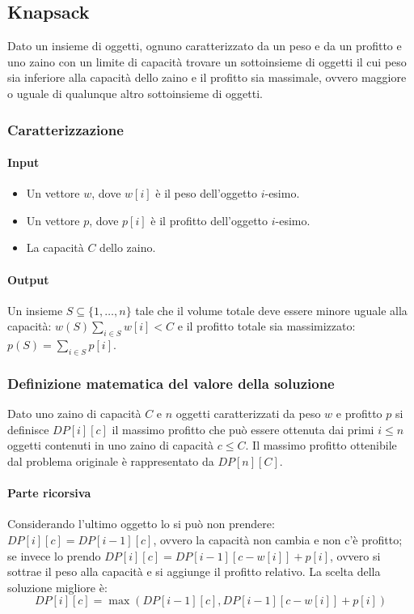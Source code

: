 \subsection{Knapsack}
Dato un insieme di oggetti, ognuno caratterizzato da un peso e da un profitto e uno zaino con un limite di capacit\`a trovare un sottoinsieme di oggetti il 
cui peso sia inferiore alla capacit\`a dello zaino e il profitto sia massimale, ovvero maggiore o uguale di qualunque altro sottoinsieme di oggetti. 
\subsubsection{Caratterizzazione}
\paragraph{Input}
\begin{itemize}
\item Un vettore $w$, dove $w[i]$ \`e il peso dell'oggetto $i$-esimo.
\item Un vettore $p$, dove $p[i]$ \`e il profitto dell'oggetto $i$-esimo.
\item La capacit\`a $C$ dello zaino.
\end{itemize}
\paragraph{Output}
Un insieme $S\subseteq\{1,\dots, n\}$ tale che il volume totale deve essere minore uguale alla capacit\`a: $w(S)\sum\limits_{i\in S}w[i]<C$ e il profitto
totale sia massimizzato: $p(S)=\sum\limits_{i\in S}p[i]$.
\subsubsection{Definizione matematica del valore della soluzione}
Dato uno zaino di capacit\`a $C$ e $n$ oggetti caratterizzati da peso $w$ e profitto $p$ si definisce $DP[i][c]$ il massimo profitto che pu\`o essere 
ottenuta dai primi $i\le n$ oggetti contenuti in uno zaino di capacit\`a $c\le C$. Il massimo profitto ottenibile dal problema originale \`e rappresentato
da $DP[n][C]$.
\paragraph{Parte ricorsiva}
Considerando l'ultimo oggetto lo si pu\`o non prendere: $DP[i][c]=DP[i-1][c]$, ovvero la capacit\`a non cambia e non c'\`e profitto; se invece lo prendo
$DP[i][c]=DP[i-1][c-w[i]]+p[i]$, ovvero si sottrae il peso alla capacit\`a e si aggiunge il profitto relativo. La scelta della soluzione migliore \`e:
$$DP[i][c] = \max(DP[i-1][c], DP[i-1][c-w[i]]+p[i])$$
